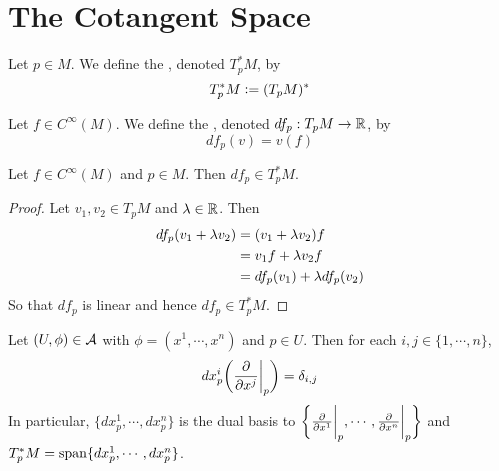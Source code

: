\documentclass{book}
\begin{document}
	
	
	
	
	
	
	
	
	
	
	
	
	
	
	\newpage
	\section{The Cotangent Space}	
	
	
	\begin{defn}
	Let $p \in M$. We define the , denoted $T^*_pM$, by $$T^*_pM \vcentcolon= (T_pM)^*$$
	\end{defn}
	
	\begin{defn}
	Let $f \in C^{\infty}(M)$. We define the , denoted $df_p:T_pM \rightarrow \mathbb{R}$, by $$df_p(v) = v(f)$$
	\end{defn}
	
	\begin{ex}
	Let $f \in C^{\infty}(M)$ and $p \in M$. Then $df_p \in T^*_pM$.
	\end{ex}
	
	\begin{proof}
	Let $v_1, v_2 \in T_pM$ and $\lambda \in \mathbb{R}$. Then 
	\begin{align*}
	df_p(v_1 + \lambda v_2) 
	&= (v_1 + \lambda v_2) f \\
	&= v_1 f + \lambda v_2 f \\
	&= df_p(v_1) + \lambda df_p(v_2)
	\end{align*}
	So that $df_p$ is linear and hence $df_p \in T^*_pM$.
	\end{proof}
	
	\begin{ex}
		Let $(U, \phi) \in \mathcal{A}$ with $\phi = (x^1, \cdots, x^n)$ and $p \in U$. Then for each $i,j \in \{1, \cdots, n\}$, $$dx^i_p \bigg(\frac{\partial }{\partial x^j} \bigg|_p \bigg) = \delta_{i,j}$$ 
		In particular, $\{dx^1_p, \cdots, dx^n_p \}$ is the dual basis to $\bigg \{ \frac{\partial}{\partial x^1} \bigg|_p, \cdots, \frac{\partial}{\partial x^n} \bigg|_p \bigg \}$ and $T_p^*M = \operatorname{span}\{dx^1_p, \cdots, dx^n_p\}$.
	\end{ex}
\end{document}
